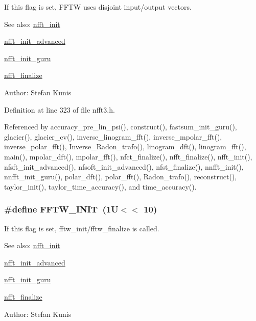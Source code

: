 If this flag is set, FFTW uses disjoint input/output vectors. 

\begin{Desc}
\item[See also:]\hyperlink{group__nfft_g1dfeaf18f3735f035afa62ca768d99c4}{nfft\_\-init} 

\hyperlink{group__nfft_gcd4a22fd1f6ea476a57759a90510d114}{nfft\_\-init\_\-advanced} 

\hyperlink{group__nfft_g406f05717c6299b918261c61aaa9de23}{nfft\_\-init\_\-guru} 

\hyperlink{group__nfft_g614f9f7af5b0d5491afa9495393c4dc3}{nfft\_\-finalize} \end{Desc}
\begin{Desc}
\item[Author:]Stefan Kunis \end{Desc}


Definition at line 323 of file nfft3.h.

Referenced by accuracy\_\-pre\_\-lin\_\-psi(), construct(), fastsum\_\-init\_\-guru(), glacier(), glacier\_\-cv(), inverse\_\-linogram\_\-fft(), inverse\_\-mpolar\_\-fft(), inverse\_\-polar\_\-fft(), Inverse\_\-Radon\_\-trafo(), linogram\_\-dft(), linogram\_\-fft(), main(), mpolar\_\-dft(), mpolar\_\-fft(), nfct\_\-finalize(), nfft\_\-finalize(), nfft\_\-init(), nfsft\_\-init\_\-advanced(), nfsoft\_\-init\_\-advanced(), nfst\_\-finalize(), nnfft\_\-init(), nnfft\_\-init\_\-guru(), polar\_\-dft(), polar\_\-fft(), Radon\_\-trafo(), reconstruct(), taylor\_\-init(), taylor\_\-time\_\-accuracy(), and time\_\-accuracy().\hypertarget{group__nfft_gd3fe6867a3351441c6f44dd5a3746f5b}{
\subsubsection{\setlength{\rightskip}{0pt plus 5cm}\#define FFTW\_\-INIT~(1U$<$$<$ 10)}}
\label{group__nfft_gd3fe6867a3351441c6f44dd5a3746f5b}


If this flag is set, fftw\_\-init/fftw\_\-finalize is called. 

\begin{Desc}
\item[See also:]\hyperlink{group__nfft_g1dfeaf18f3735f035afa62ca768d99c4}{nfft\_\-init} 

\hyperlink{group__nfft_gcd4a22fd1f6ea476a57759a90510d114}{nfft\_\-init\_\-advanced} 

\hyperlink{group__nfft_g406f05717c6299b918261c61aaa9de23}{nfft\_\-init\_\-guru} 

\hyperlink{group__nfft_g614f9f7af5b0d5491afa9495393c4dc3}{nfft\_\-finalize} \end{Desc}
\begin{Desc}
\item[Author:]Stefan Kunis \end{Desc}


